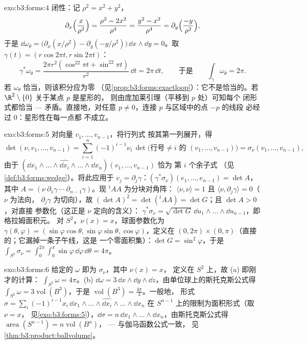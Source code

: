 \begin{solution}{exo:b3:forms:4}
闭性：记 $\rho^2 = x^2 + y^2$，
\[
\partial_x\Bigl(\frac{x}{\rho^2}\Bigr) = \frac{\rho^2 -
2x^2}{\rho^4} = \frac{y^2 - x^2}{\rho^4} =
\partial_y\Bigl(\frac{-y}{\rho^2}\Bigr),
\]
于是 $\dd\omega_\theta = \bigl(\partial_x(x/\rho^2) -
\partial_y(-y/\rho^2)\bigr)\,\dd x\wedge\dd y = 0$。取
$\gamma(t) = (r\cos2\pi t, r\sin2\pi t)$：
\[
\gamma^*\omega_\theta = \frac{2\pi r^2(\cos^22\pi t +
\sin^22\pi t)}{r^2}\,\dd t = 2\pi\,\dd t,
\qquad\text{于是}\qquad
\int_\gamma\omega_\theta = 2\pi .
\] 若 $\omega_\theta$
恰当，则该积分应为零
（见\cref{prop:b3:forms:exactloop}）：它不是恰当的。若
$\R^2\setminus\{0\}$ 关于某点 $p$ 是星形的，
则由庞加莱引理（平移到 $p$ 处）可知每个
闭形式都恰当 --- 矛盾。直接地，对任意 $p
\neq 0$，连接 $p$ 与区域中的点 $-p$ 的线段
必经过 $0$：星形性在每一点都
不成立。
\end{solution}

\begin{solution}{exo:b3:forms:5}
对向量 $v_1, \dots, v_{n-1}$，将行列式
按其第一列展开，得
\[
\det(\nu, v_1, \dots, v_{n-1}) =
\sum_{i=1}^n(-1)^{i-1}\nu_i\,
\det\bigl(\text{行号} \neq i \text{ 的 } (v_1, \dots,
v_{n-1})\bigr)
= \sigma_\nu(v_1, \dots, v_{n-1}),
\]
由于 $(\dd x_1\wedge\dots\wedge\widehat{\dd
x_i}\wedge\dots\wedge\dd x_n)(v_1, \dots, v_{n-1})$ 恰为
第 $i$ 个余子式
（见\cref{def:b3:forms:wedge}）。将此应用于 $v_j =
\partial_j\gamma$：$(\gamma^*\sigma_\nu)(e_1, \dots,
e_{n-1}) = \det A$，其中 $A = (\nu\ \partial_1\gamma\ \cdots\
\partial_{n-1}\gamma)$。现 ${}^t\!AA$ 为分块对角阵：
$\langle\nu, \nu\rangle = 1$ 且 $\langle\nu,
\partial_j\gamma\rangle = 0$（$\nu$ 为法向，
$\partial_j\gamma$ 为切向），故 $(\det A)^2 =
\det({}^t\!AA) = \det G$；且 $\det A > 0$，对直接
参数化（这正是 $\nu$ 定向的含义）：
$\gamma^*\sigma_\nu = \sqrt{\det G}\,\dd
u_1\wedge\dots\wedge\dd u_{n-1}$，即格拉姆面积元。
对 $S^2$，$\nu(x) = x$，球面参数化为
$\gamma(\theta, \varphi) = (\sin\varphi\cos\theta,
\sin\varphi\sin\theta, \cos\varphi)$，定义在
$(0,2\pi)\times(0,\pi)$（直接的；它漏掉一条子午线，这是
一个零面积集）：$\det G = \sin^2\varphi$，于是
$\int_{S^2}\sigma_\nu =
\int_0^{2\pi}\!\!\int_0^\pi\sin\varphi\,\dd\varphi\,
\dd\theta = 4\pi$。
\end{solution}

\begin{solution}{exo:b3:forms:6}
给定的 $\omega$ 即为 $\sigma_\nu$，其中 $\nu(x) = x$，
定义在 $S^2$ 上，故 (a) 即刚才的计算：
$\int_{S^2}\omega = 4\pi$。(b) $\dd\omega = 3\,\dd
x\wedge\dd y\wedge\dd z$，由单位球上的斯托克斯公式得
$\int_{S^2}\omega = 3\operatorname{vol}(B^3)$，于是
$\operatorname{vol}(B^3) = \frac{4\pi}3$。一般地，
形式 $\sigma = \sum_i(-1)^{i-1}x_i\,\dd
x_1\wedge\dots\wedge\widehat{\dd x_i}\wedge\dots\wedge\dd
x_n$ 在 $S^{n-1}$ 上的限制为面积形式（取 $\nu = x$，
见\cref{exo:b3:forms:5}），$\dd\sigma = n\,\dd
x_1\wedge\dots\wedge\dd x_n$，由斯托克斯公式得
$\operatorname{area}(S^{n-1}) = n\operatorname{vol}(B^n)$，
--- 与伽马函数公式一致，
见\cref{thm:b3:product:ballvolume}。
\end{solution}

